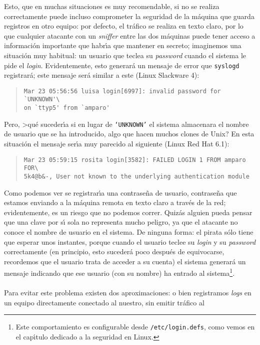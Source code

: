 Esto, que en muchas situaciones es muy recomendable, si no se realiza 
correctamente puede incluso comprometer la seguridad de la m\'aquina que guarda
registros en otro equipo: por defecto, el tr\'afico se realiza en texto claro,
por lo que cualquier atacante con un {\it sniffer} entre las dos m\'aquinas 
puede tener acceso a informaci\'on importante que habr\'{\i}a que mantener en
secreto; imaginemos una situaci\'on muy habitual: un usuario que teclea su 
{\it password} cuando el sistema le pide el {\it login}. Evidentemente, esto
generar\'a un mensaje de error que {\tt syslogd} registrar\'a; este mensaje
ser\'a similar a este (Linux Slackware 4):
\begin{quote}
\begin{verbatim}
Mar 23 05:56:56 luisa login[6997]: invalid password for `UNKNOWN'\
on `ttyp5' from `amparo'
\end{verbatim}
\end{quote}
Pero, >qu\'e suceder\'{\i}a si en lugar de {\tt `UNKNOWN'} el sistema almacenara
el nombre de usuario que se ha introducido, algo que hacen muchos
clones de Unix? En esta situaci\'on el mensaje ser\'{\i}a muy parecido al
siguiente (Linux Red Hat 6.1):
\begin{quote}
\begin{verbatim}
Mar 23 05:59:15 rosita login[3582]: FAILED LOGIN 1 FROM amparo FOR\
5k4@b&-, User not known to the underlying authentication module
\end{verbatim}
\end{quote}
Como podemos ver se registrar\'{\i}a una contrase\~na de usuario, 
contrase\~na que estamos enviando a la m\'aquina remota en
texto claro a trav\'es de la red; evidentemente, es un riesgo que no podemos
correr. Quiz\'as alguien pueda pensar que una clave por s\'{\i} sola no
representa mucho peligro, ya que el atacante no conoce el nombre de usuario en 
el sistema. De ninguna forma: el pirata s\'olo tiene que esperar unos 
instantes, 
porque cuando el usuario teclee su {\it login} y su {\it password} correctamente
(en principio, esto suceder\'a poco despu\'es de equivocarse, recordemos que
el usuario trata de acceder a su cuenta) el sistema generar\'a un mensaje 
indicando que ese usuario (con su nombre) ha entrado al sistema\footnote{Este
comportamiento es configurable desde {\tt /etc/login.defs}, como vemos en el
cap\'{\i}tulo dedicado a la seguridad en Linux.}.\\
\\Para evitar este problema existen dos aproximaciones: o bien registramos {\it 
logs} en un equipo directamente conectado al nuestro, sin emitir tr\'afico al 
